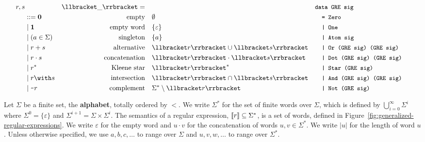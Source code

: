 \begin{figure*}[!bt]
  \centering
  \begin{minipage}{1.0\linewidth}
  \begin{align*}
    r, s & \vspace{10cm}\ &\Lang{\_}=\quad &  &
                             \makebox[1em][l]{\code{data GRE sig}}\\
         & ::= \Rnull & \ltext{empty}
                        & \emptyset
                           &&\code{= Zero}\\
         & \mid \Rempty & \ltext{empty word}
                        & \{ \varepsilon \}
                           && \code{| One}\\
         & \mid (a \in \Sigma) & \ltext{singleton}
                        &  \{ a \}
                           && \code{| Atom sig} \\
         & \mid \Runion rs & \ltext{alternative}
                        &  \Lang{r} \cup \Lang{s}
                           && \code{| Or (GRE sig) (GRE sig)}\\
         & \mid \Rconcat rs & \ltext{concatenation}
                        &  \Lang r \cdot \Lang s
                           && \code{| Dot (GRE sig) (GRE sig)}\\
         & \mid \Rstar r & \ltext{Kleene star}
                        & \Lang r^* 
                           && \code{| Star (GRE sig)}\\
         & \mid \Rintersect rs & \ltext{intersection}
                        & \Lang r \cap \Lang s
                           && \code{| And (GRE sig) (GRE sig)}\\
         & \mid \Rcomplement r & \ltext{complement}
                        & \Sigma^* \setminus \Lang r
                           && \code{| Not (GRE sig)}
  \end{align*}
  \end{minipage}
  \caption{Generalized regular expressions: syntax, semantics, and Haskell encoding}
  \label{fig:generalized-regular-expressions}
\end{figure*}

Let $\Sigma$ be a finite set, the \textbf{alphabet}, totally ordered by $<$.  We write
$\Sigma^*$ for the set of finite words over $\Sigma$, which is defined
by $\bigcup_{i=0}^\infty \Sigma^i$ where $\Sigma^0 = \{\varepsilon\}$
and $\Sigma^{i+1} = \Sigma \times \Sigma^i$.
The
semantics of a regular expression, $\llbracket r\rrbracket \subseteq \Sigma^*$, is a set of
words, defined in Figure~\ref{fig:generalized-regular-expressions}.
We write
$\varepsilon$ for the empty word and $u\cdot v$ for the concatenation
of words $u, v \in \Sigma^*$. We write $|u|$ for the length of word
$u$. Unless otherwise specified, we use $a, b, c, \dots$ to range over
$\Sigma$ and $u, v, w, \dots$ to range over $\Sigma^*$.

